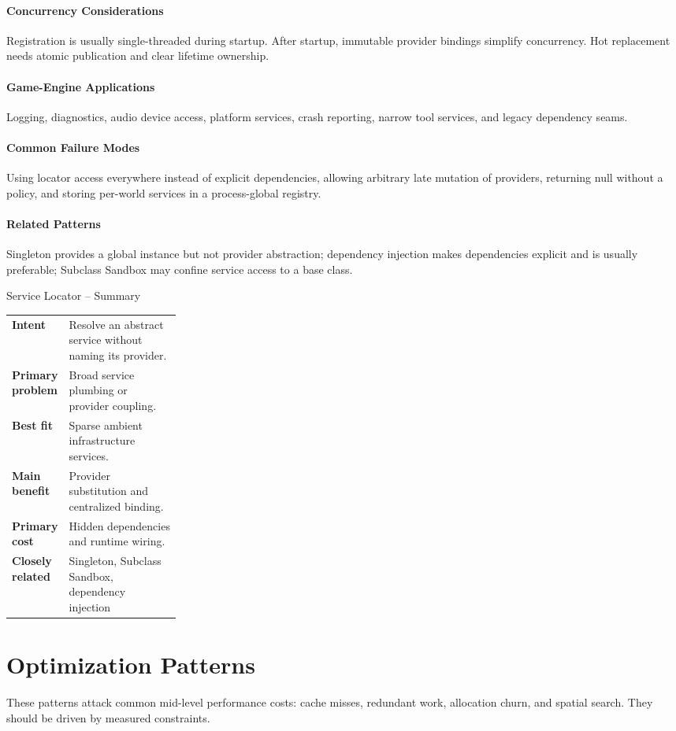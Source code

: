 \documentclass[11pt]{article}
\begin{document}
\paragraph{Concurrency Considerations} Registration is usually single-threaded during startup. After startup, immutable provider bindings simplify concurrency. Hot replacement needs atomic publication and clear lifetime ownership.
\paragraph{Game-Engine Applications} Logging, diagnostics, audio device access, platform services, crash reporting, narrow tool services, and legacy dependency seams.
\paragraph{Common Failure Modes} Using locator access everywhere instead of explicit dependencies, allowing arbitrary late mutation of providers, returning null without a policy, and storing per-world services in a process-global registry.
\paragraph{Related Patterns} Singleton provides a global instance but not provider abstraction; dependency injection makes dependencies explicit and is usually preferable; Subclass Sandbox may confine service access to a base class.

\begin{patternsummary}{Service Locator -- Summary}
\begin{tabularx}{\linewidth}{@{}>{\bfseries}p{0.25\linewidth}X@{}}
Intent & Resolve an abstract service without naming its provider. \\
Primary problem & Broad service plumbing or provider coupling. \\
Best fit & Sparse ambient infrastructure services. \\
Main benefit & Provider substitution and centralized binding. \\
Primary cost & Hidden dependencies and runtime wiring. \\
Closely related & Singleton, Subclass Sandbox, dependency injection \\
\end{tabularx}
\end{patternsummary}

\section{Optimization Patterns}\label{sec:optimization}
These patterns attack common mid-level performance costs: cache misses, redundant work, allocation churn, and spatial search. They should be driven by measured constraints.
\end{document}
